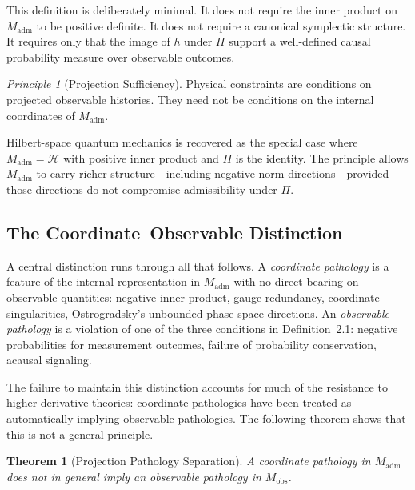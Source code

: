 \documentclass[12pt,a4paper]{article}
\newtheorem{theorem}{Theorem}[section]
\theoremstyle{remark}
\newtheorem{principle}{Principle}[section]
\begin{document}
This definition is deliberately minimal. It does not require the inner
product on $M_{\mathrm{adm}}$ to be positive definite. It does not require
a canonical symplectic structure. It requires only that the image of $h$
under $\Pi$ support a well-defined causal probability measure over
observable outcomes.

\begin{principle}[Projection Sufficiency]
Physical constraints are conditions on projected observable histories.
They need not be conditions on the internal coordinates of $M_{\mathrm{adm}}$.
\end{principle}

Hilbert-space quantum mechanics is recovered as the special case where
$M_{\mathrm{adm}} = \mathcal{H}$ with positive inner product and $\Pi$ is
the identity. The principle allows $M_{\mathrm{adm}}$ to carry richer
structure---including negative-norm directions---provided those directions
do not compromise admissibility under $\Pi$.

\subsection{The Coordinate--Observable Distinction}

A central distinction runs through all that follows. A \emph{coordinate
pathology} is a feature of the internal representation in $M_{\mathrm{adm}}$
with no direct bearing on observable quantities: negative inner product,
gauge redundancy, coordinate singularities, Ostrogradsky's unbounded
phase-space directions. An \emph{observable pathology} is a violation of
one of the three conditions in Definition~2.1: negative probabilities for
measurement outcomes, failure of probability conservation, acausal signaling.

The failure to maintain this distinction accounts for much of the resistance
to higher-derivative theories: coordinate pathologies have been treated as
automatically implying observable pathologies. The following theorem shows
that this is not a general principle.

\begin{theorem}[Projection Pathology Separation]
A coordinate pathology in $M_{\mathrm{adm}}$ does not in general imply an
observable pathology in $M_{\mathrm{obs}}$.
\end{theorem}
\end{document}
